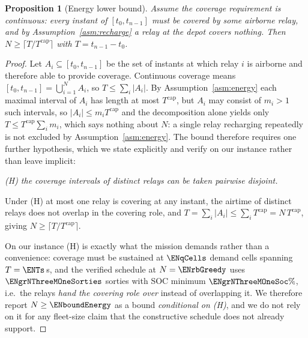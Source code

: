 \documentclass[11pt]{article}
\theoremstyle{dshplain}
\newtheorem{proposition}[theorem]{Proposition}
\theoremstyle{dshdefn}
\begin{document}
\begin{proposition}[Energy lower bound]
\label{prop:energy}
Assume the coverage requirement is \emph{continuous}: every instant of
$[t_0,t_{n-1}]$ must be covered by some airborne relay, and by
Assumption~\ref{asm:recharge} a relay at the depot covers nothing. Then
$N\ge\bigl\lceil T/T^{\mathrm{cap}}\bigr\rceil$ with $T=t_{n-1}-t_0$.
\end{proposition}
\begin{proof}
Let $A_i\subseteq[t_0,t_{n-1}]$ be the set of instants at which relay $i$ is
airborne and therefore able to provide coverage. Continuous coverage means
$[t_0,t_{n-1}]=\bigcup_{i=1}^{N}A_i$, so $T\le\sum_i|A_i|$. By
Assumption~\ref{asm:energy} each maximal interval of $A_i$ has length at most
$T^{\mathrm{cap}}$, but $A_i$ may consist of $m_i>1$ such intervals, so
$|A_i|\le m_iT^{\mathrm{cap}}$ and the decomposition alone yields only
$T\le T^{\mathrm{cap}}\sum_i m_i$, which says nothing about $N$: a single relay
recharging repeatedly is not excluded by Assumption~\ref{asm:energy}. The bound
therefore requires one further hypothesis, which we state explicitly and verify on
our instance rather than leave implicit:

\smallskip
\noindent\emph{(H) the coverage intervals of distinct relays can be taken
pairwise disjoint.}
\smallskip

\noindent Under (H) at most one relay is covering at any instant, the airtime of
distinct relays does not overlap in the covering role, and
$T=\sum_i|A_i|\le\sum_iT^{\mathrm{cap}}=N\,T^{\mathrm{cap}}$, giving
$N\ge\lceil T/T^{\mathrm{cap}}\rceil$.

\smallskip
\noindent On our instance (H) is exactly what the mission demands rather than a
convenience: coverage must be sustained at $\ENqCells$ demand cells spanning
$T=\ENTs$\,s, and the verified schedule at $N=\ENrbGreedy$ uses
$\ENgrNThreeMOneSorties$ sorties with SOC minimum $\ENgrNThreeMOneSoc\%$, i.e.\ the
relays \emph{hand the covering role over} instead of overlapping it. We therefore
report $N\ge\ENboundEnergy$ as a bound \emph{conditional on (H)}, and we do not
rely on it for any fleet-size claim that the constructive schedule does not
already support.
\end{proof}
\end{document}
